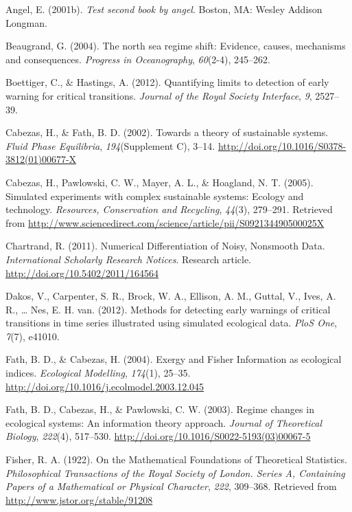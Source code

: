 \documentclass[12pt,twoside]{reedthesis}
\begin{document}
\hypertarget{ref-angel2002a}{}
Angel, E. (2001b). \emph{Test second book by angel}. Boston, MA: Wesley
Addison Longman.

\hypertarget{ref-beaugrand2004north}{}
Beaugrand, G. (2004). The north sea regime shift: Evidence, causes,
mechanisms and consequences. \emph{Progress in Oceanography},
\emph{60}(2-4), 245--262.

\hypertarget{ref-boettiger_quantifying_2012}{}
Boettiger, C., \& Hastings, A. (2012). Quantifying limits to detection
of early warning for critical transitions. \emph{Journal of the Royal
Society Interface}, \emph{9}, 2527--39.

\hypertarget{ref-cabezas_towards_2002}{}
Cabezas, H., \& Fath, B. D. (2002). Towards a theory of sustainable
systems. \emph{Fluid Phase Equilibria}, \emph{194}(Supplement C), 3--14.
\url{http://doi.org/10.1016/S0378-3812(01)00677-X}

\hypertarget{ref-cabezas_simulated_2005}{}
Cabezas, H., Pawlowski, C. W., Mayer, A. L., \& Hoagland, N. T. (2005).
Simulated experiments with complex sustainable systems: Ecology and
technology. \emph{Resources, Conservation and Recycling}, \emph{44}(3),
279--291. Retrieved from
\url{http://www.sciencedirect.com/science/article/pii/S092134490500025X}

\hypertarget{ref-chartrand_numerical_2011}{}
Chartrand, R. (2011). Numerical Differentiation of Noisy, Nonsmooth
Data. \emph{International Scholarly Research Notices}. Research article.
\url{http://doi.org/10.5402/2011/164564}

\hypertarget{ref-dakos_methods_2012}{}
Dakos, V., Carpenter, S. R., Brock, W. A., Ellison, A. M., Guttal, V.,
Ives, A. R., \ldots{} Nes, E. H. van. (2012). Methods for detecting
early warnings of critical transitions in time series illustrated using
simulated ecological data. \emph{PloS One}, \emph{7}(7), e41010.

\hypertarget{ref-fath_exergy_2004}{}
Fath, B. D., \& Cabezas, H. (2004). Exergy and Fisher Information as
ecological indices. \emph{Ecological Modelling}, \emph{174}(1), 25--35.
\url{http://doi.org/10.1016/j.ecolmodel.2003.12.045}

\hypertarget{ref-fath_regime_2003}{}
Fath, B. D., Cabezas, H., \& Pawlowski, C. W. (2003). Regime changes in
ecological systems: An information theory approach. \emph{Journal of
Theoretical Biology}, \emph{222}(4), 517--530.
\url{http://doi.org/10.1016/S0022-5193(03)00067-5}

\hypertarget{ref-fisher_mathematical_1922}{}
Fisher, R. A. (1922). On the Mathematical Foundations of Theoretical
Statistics. \emph{Philosophical Transactions of the Royal Society of
London. Series A, Containing Papers of a Mathematical or Physical
Character}, \emph{222}, 309--368. Retrieved from
\url{http://www.jstor.org/stable/91208}
\end{document}
